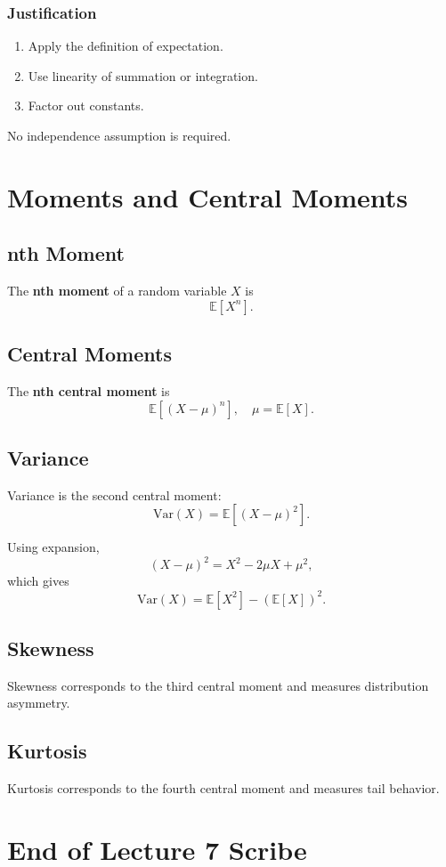 \documentclass[12pt]{article}
\begin{document}
\subsubsection*{Justification}

\begin{enumerate}
    \item Apply the definition of expectation.
    \item Use linearity of summation or integration.
    \item Factor out constants.
\end{enumerate}

No independence assumption is required.

\section{Moments and Central Moments}

\subsection{nth Moment}

The \textbf{nth moment} of a random variable $X$ is
\[
\mathbb{E}[X^n].
\]

\subsection{Central Moments}

The \textbf{nth central moment} is
\[
\mathbb{E}[(X - \mu)^n], \quad \mu = \mathbb{E}[X].
\]

\subsection{Variance}

Variance is the second central moment:
\[
\mathrm{Var}(X) = \mathbb{E}[(X - \mu)^2].
\]

Using expansion,
\[
(X - \mu)^2 = X^2 - 2\mu X + \mu^2,
\]
which gives
\[
\mathrm{Var}(X) = \mathbb{E}[X^2] - (\mathbb{E}[X])^2.
\]

\subsection{Skewness}

Skewness corresponds to the third central moment and measures distribution asymmetry.

\subsection{Kurtosis}

Kurtosis corresponds to the fourth central moment and measures tail behavior.

\section*{End of Lecture 7 Scribe}
\end{document}
